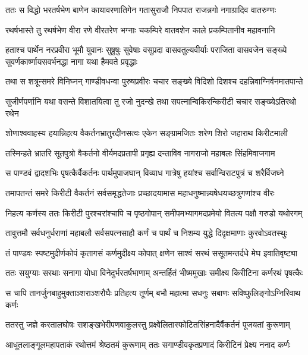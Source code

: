 \twolineshloka
{ततः स विद्धो भरतर्षभेण बाणेन कायावरणातिगेन}
{गतासुराजौ निपपात राजन्नगो नगाग्रादिव वातरुग्णः}


\twolineshloka
{रथर्षभास्ते तु रथर्षभेण वीरा रणे वीरतरेण भग्नाः}
{चकम्पिरे वातवशेन काले प्रकम्पितानीव महावनानि}


\threelineshloka
{हताश्च पार्थेन नरप्रवीरा भूमौ युवानः सुष्रुषुः सुवेषाः}
{वसुप्रदा वासवतुल्यवीर्याः पराजिता वासवजेन सङ्ख्ये}
{सुवर्णकार्ष्णायसवर्भनद्धा नागा यथा हैमवते प्रवृद्धाः}


\twolineshloka
{तथा स शत्रून्समरे विनिघ्नन् गाण्डीवधन्वा पुरुषप्रवीरः}
{चचार सङ्ख्ये विदिशो दिशश्च दहन्निवाग्निर्वनमातपान्ते}


\twolineshloka
{सुजीर्णपर्णानि यथा वसन्ते विशातयित्वा तु रजो नुदन्खे}
{तथा सपत्नान्विकिरन्किरीटी चचार सङ्ख्येऽतिरथो रथेन}


\twolineshloka
{शोणाश्ववाहस्य हयान्निहत्य वैकर्तनभ्रातुरदीनसत्वः}
{एकेन सङ्ग्रामजितः शरेण शिरो जहाराथ किरीटमाली}


\twolineshloka
{तस्मिन्हते भ्रातरि सूतपुत्रो वैकर्तनो वीर्यमदप्रतापी}
{प्रगृह्य दन्ताविव नागराजो महाबलः सिंहमिवाजगाम}


\twolineshloka
{स पाण्डवं द्वादशभिः पृषत्कैर्वैकर्तनः पार्थमुपाजघान्}
{विव्याध गात्रेषु हयांश्च सर्वान्विराटपुत्रं च शरैर्विजघ्ने}


\twolineshloka
{तमापतन्तं समरे किरीटी वैकर्तनं सर्वसमृद्धतेजाः}
{प्रच्छादयामास महाधनुष्मान्न्यषेधयच्छत्रुगणांश्च वीरः}


\twolineshloka
{निहत्य कर्णस्य ततः किरीटी पुरश्चरांश्चापि च पृष्ठगोपान्}
{समीपमभ्यागमदप्रमेयो वितत्य पक्षौ गरुडो यथोरगम्}


\twolineshloka
{तावुत्तमौ सर्वधनुर्धराणां महाबलौ सर्वसपत्नसाहौ}
{कर्णं च पार्थं च निशम्य युद्धे दिदृक्षमाणाः कुरवोऽवतस्थुः}


\twolineshloka
{तं पाण्डवः स्पष्टमुदीर्णकोपं कृतागसं कर्णमुदीक्ष्य कोपात्}
{क्षणेन साश्वं सरथं ससूतमन्तर्दधे मेघ इवातिवृष्ट्या}


\twolineshloka
{ततः सयुग्याः सरथाः सनागा योधा विनेदुर्भरतर्षभाणाम्}
{अन्तर्हितं भीष्ममुखाः समीक्ष्य किरीटिना कर्णरथं पृषत्कैः}


\twolineshloka
{स चापि तानर्जुनबाहुमुक्ताञ्शराञ्शरौघैः प्रतिहत्य तूर्णम्}
{बभौ महात्मा सधनुः सबाणः सविष्फुलिङ्गोऽग्निरिवाथ कर्णः}


\twolineshloka
{ततस्तु जज्ञे करतालघोषः सशङ्खभेरीपणवाकुलस्तु}
{प्रक्ष्वेलितास्फोटितसिंहनादैर्वैकर्तनं पूजयतां कुरूणाम्}


\twolineshloka
{आधूतलाङ्गूलमहापताकं रथोत्तमं श्रेष्ठतमं कुरूणाम्}
{ततः सगाण्डीवकृतप्रणादं किरीटिनं प्रेक्ष्य ननाद कर्णः}


